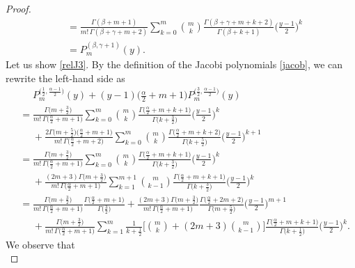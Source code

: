\documentclass[10pt,a4paper]{amsart}
\begin{document}
\begin{proof}
\begin{align*}
		&=  \frac{\Gamma(\beta+m+1)}{m! \, \Gamma(\beta+\gamma+m+2)}\sum_{k=0}^m \binom{m}{k} \frac{\Gamma(\beta+\gamma+m+k+2)}{\Gamma(\beta+k+1)}\bigg(\frac{y-1}{2}\bigg)^{k}\\
		&= P^{(\beta, \gamma+1)}_{m}(y).
	\end{align*}
	\endgroup
Let us show \eqref{relJ3}. By the definition of the Jacobi polynomials \eqref{jacob}, we can rewrite the left-hand side as
			\begingroup\allowdisplaybreaks
\begin{align*}
	&\phantom{=}P_m^{\big(\frac{1}{2},\frac{\alpha-1}{2}\big)}(y)
+(y-1)\Big(\frac{\alpha}{2}+m+1\Big)P_m^{\big(\frac{3}{2}, \frac{\alpha-1}{2}\big)}(y)\\
	&=\frac{\Gamma \big(m+\frac{3}{2}\big)}{m!\, \Gamma \big(\frac{\alpha}{2}+m+1\big)} \sum_{k=0}^{m} \binom{m}{k} \frac{\Gamma\big(\frac{\alpha}{2}+m+k+1\big)}{\Gamma \big(k+\frac{3}{2}\big)} \bigg(\frac{y-1}{2}\bigg)^k\\
	&\phantom{=}+\frac{2\Gamma \big(m+\frac{5}{2}\big)\big(\frac{\alpha}{2}+m+1\big)}{m!\, \Gamma\big(\frac{\alpha}{2}+m+2\big)} \sum_{k=0}^{m} \binom{m}{k} \frac{\Gamma\big(\frac{\alpha}{2}+m+k+2\big)}{\Gamma \big(k+\frac{5}{2}\big)} \bigg(\frac{y-1}{2}\bigg)^{k+1}\\
	&=\frac{\Gamma \big(m+\frac{3}{2}\big)}{m!\, \Gamma \big(\frac{\alpha}{2}+m+1\big)} \sum_{k=0}^{m} \binom{m}{k} \frac{\Gamma\big(\frac{\alpha}{2}+m+k+1\big)}{\Gamma \big(k+\frac{3}{2}\big)} \bigg(\frac{y-1}{2}\bigg)^k\\
	&\phantom{=}+\frac{(2m+3)\Gamma \big(m+\frac{3}{2}\big)}{m!\, \Gamma\big(\frac{\alpha}{2}+m+1\big)} \sum_{k=1}^{m+1} \binom{m}{k-1} \frac{\Gamma\big(\frac{\alpha}{2}+m+k+1\big)}{\Gamma \big(k+\frac{3}{2}\big)} \bigg(\frac{y-1}{2}\bigg)^{k}\\
	&=\frac{\Gamma \big(m+\frac{3}{2}\big)}{m!\, \Gamma \big(\frac{\alpha}{2}+m+1\big)} \frac{\Gamma \big(\frac{\alpha}{2}+m+1\big)}{\Gamma\big(\frac{3}{2}\big)}
	+\frac{(2m+3)\Gamma \big(m+\frac{3}{2}\big)}{m!\, \Gamma \big(\frac{\alpha}{2}+m+1\big)} \frac{\Gamma \big(\frac{\alpha}{2}+2m+2\big)}{\Gamma\big(m+\frac{5}{2}\big)}\bigg(\frac{y-1}{2}\bigg)^{m+1}\\
	&\phantom{=}+
	\frac{\Gamma \big(m+\frac{3}{2}\big)}{m!\, \Gamma \big(\frac{\alpha}{2}+m+1\big)}  \sum_{k=1}^{m} \frac{1}{k+\frac{1}{2}}\bigg[\binom{m}{k}+(2m+3) \binom{m}{k-1}\bigg] \frac{\Gamma\big(\frac{\alpha}{2}+m+k+1\big)}{\Gamma \big(k+\frac{1}{2}\big)} \bigg(\frac{y-1}{2}\bigg)^k.
\end{align*}
\endgroup
We observe that
\begin{equation}

\end{equation}
\end{proof}
\end{document}
